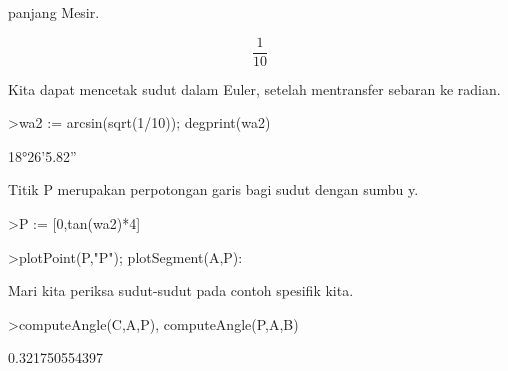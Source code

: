\documentclass[a4paper,10pt]{article}
\begin{document}
\begin{eulernotebook}
\begin{eulercomment}
\begin{eulercomment}
\begin{eulercomment}
\begin{eulercomment}
\begin{eulercomment}
\begin{eulercomment}
\begin{eulercomment}
\begin{eulercomment}
\begin{eulercomment}
\begin{eulercomment}
\begin{eulercomment}
\begin{eulercomment}
\begin{eulercomment}
\begin{eulercomment}
\begin{eulercomment}
\begin{eulercomment}
\begin{eulercomment}
\begin{eulercomment}
\begin{eulercomment}
\begin{eulercomment}
\begin{eulercomment}
\begin{eulercomment}
\begin{eulercomment}
\begin{eulercomment}
\begin{eulercomment}
\begin{eulercomment}
\begin{eulercomment}
\begin{eulercomment}
\begin{eulercomment}
\begin{eulercomment}
\begin{eulercomment}
\begin{eulercomment}
\begin{eulercomment}
\begin{eulercomment}
\begin{eulercomment}
\begin{eulercomment}
\begin{eulercomment}
\begin{eulercomment}
\begin{eulercomment}
\begin{eulercomment}
\begin{eulercomment}
\begin{eulercomment}
\begin{eulercomment}
\begin{eulercomment}
\begin{eulercomment}
\begin{eulercomment}
\begin{eulercomment}
\begin{eulercomment}
\begin{eulercomment}
\begin{eulercomment}
\begin{eulercomment}
\begin{eulercomment}
\begin{eulercomment}
\begin{eulercomment}
\begin{eulercomment}
\begin{eulercomment}
\begin{eulercomment}
\begin{eulercomment}
\begin{eulercomment}
\begin{eulercomment}
\begin{eulercomment}
\begin{eulercomment}
\begin{eulercomment}
panjang Mesir.
\end{eulercomment}
\begin{eulerformula}
\[
\frac{1}{10}
\]
\end{eulerformula}
\begin{eulercomment}
Kita dapat mencetak sudut dalam Euler, setelah mentransfer sebaran ke
radian.
\end{eulercomment}
\begin{eulerprompt}
>wa2 := arcsin(sqrt(1/10)); degprint(wa2)
\end{eulerprompt}
\begin{euleroutput}
  18°26'5.82''
\end{euleroutput}
\begin{eulercomment}
Titik P merupakan perpotongan garis bagi sudut dengan sumbu y.
\end{eulercomment}
\begin{eulerprompt}
>P := [0,tan(wa2)*4]
\end{eulerprompt}
\begin{euleroutput}
  [0,  1.33333]
\end{euleroutput}
\begin{eulerprompt}
>plotPoint(P,"P"); plotSegment(A,P):
\end{eulerprompt}
\begin{eulercomment}
Mari kita periksa sudut-sudut pada contoh spesifik kita.
\end{eulercomment}
\begin{eulerprompt}
>computeAngle(C,A,P), computeAngle(P,A,B)
\end{eulerprompt}
\begin{euleroutput}
  0.321750554397
 
\end{euleroutput}
\end{eulercomment}
\end{eulercomment}
\end{eulercomment}
\end{eulercomment}
\end{eulercomment}
\end{eulercomment}
\end{eulercomment}
\end{eulercomment}
\end{eulercomment}
\end{eulercomment}
\end{eulercomment}
\end{eulercomment}
\end{eulercomment}
\end{eulercomment}
\end{eulercomment}
\end{eulercomment}
\end{eulercomment}
\end{eulercomment}
\end{eulercomment}
\end{eulercomment}
\end{eulercomment}
\end{eulercomment}
\end{eulercomment}
\end{eulercomment}
\end{eulercomment}
\end{eulercomment}
\end{eulercomment}
\end{eulercomment}
\end{eulercomment}
\end{eulercomment}
\end{eulercomment}
\end{eulercomment}
\end{eulercomment}
\end{eulercomment}
\end{eulercomment}
\end{eulercomment}
\end{eulercomment}
\end{eulercomment}
\end{eulercomment}
\end{eulercomment}
\end{eulercomment}
\end{eulercomment}
\end{eulercomment}
\end{eulercomment}
\end{eulercomment}
\end{eulercomment}
\end{eulercomment}
\end{eulercomment}
\end{eulercomment}
\end{eulercomment}
\end{eulercomment}
\end{eulercomment}
\end{eulercomment}
\end{eulercomment}
\end{eulercomment}
\end{eulercomment}
\end{eulercomment}
\end{eulercomment}
\end{eulercomment}
\end{eulercomment}
\end{eulercomment}
\end{eulercomment}
\end{eulernotebook}
\end{document}

